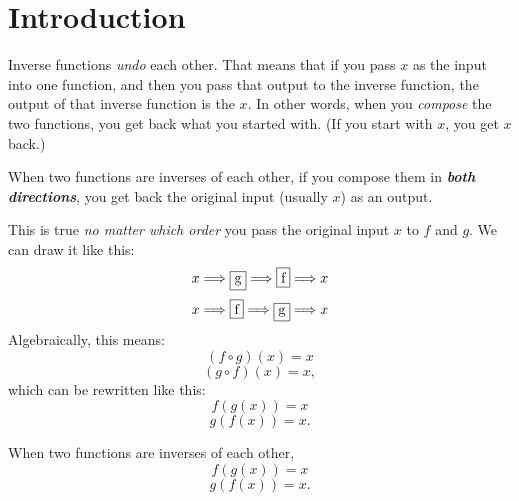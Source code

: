 \section*{Introduction}

Inverse functions \emph{undo} each other.
That means that if you pass $x$ as the input into one function,
and then you pass that output to the inverse function,
the output of that inverse function is the $x$.
In other words,
when you \emph{compose} the two functions,
you get back what you started with.
(If you start with $x$, you get $x$ back.)

\begin{center}
\begin{tcolorbox}[width=4in]
    When two functions are inverses of each other,
    if you compose them 
    in {\bfseries\itshape both directions},
    you get back the original input (usually $x$) as an output.
\end{tcolorbox}
\end{center}
%
This is true 
\emph{no matter which order} you pass the original input $x$
to $f$ and $g$.
We can draw it like this:
\[
    x 
    \Longrightarrow 
    \fbox{g} 
    \Longrightarrow 
    \fbox{f}
    \Longrightarrow 
    x
\]
\[
    x 
    \Longrightarrow 
    \fbox{f} 
    \Longrightarrow 
    \fbox{g} 
    \Longrightarrow 
    x
\]
Algebraically, this means:
\[
    (f \circ g)(x) = x
\]
\[
    (g \circ f)(x) = x,
\]
which can be rewritten like this:
\[
    f(g(x)) = x
\]
\[
    g(f(x)) = x.
\]


\begin{center}
    \begin{tcolorbox}[width=3in]
        When two functions are inverses of each other,
        \[
            f(g(x)) = x
        \]
        \[
            g(f(x)) = x.
        \]
        
    \end{tcolorbox}
    \end{center}
    